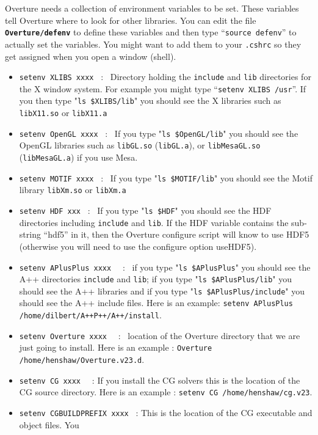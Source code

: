 \documentclass{article}
\begin{document}
Overture needs a collection of environment variables to be set. These variables tell Overture
where to look for other libraries. You can edit the
file {\tt\bf Overture/defenv} to define these variables and then type ``{\tt source defenv}'' to actually set the
variables.
You might want to add them to your {\tt .cshrc} so they get assigned when you open a window (shell).
\begin{itemize}
   \item {\tt setenv XLIBS xxxx} ~:~ Directory holding the {\tt include} and {\tt lib} directories
       for the X window system. For example you might type ``{\tt setenv XLIBS /usr}''.
        If you then type "{\tt ls \$XLIBS/lib}" you should see the X libraries
          such as {\tt libX11.so} or {\tt libX11.a} 
   \item {\tt setenv OpenGL xxxx} ~:~ If you type "{\tt ls \$OpenGL/lib}" you should see the OpenGL libraries
          such as {\tt libGL.so} ({\tt libGL.a}), or {\tt libMesaGL.so} ({\tt libMesaGL.a}) if you use Mesa.
   \item {\tt setenv MOTIF xxxx} ~:~ If you type "{\tt ls \$MOTIF/lib}" you should see the Motif library
          {\tt libXm.so} or {\tt libXm.a} 
   \item {\tt setenv HDF xxx} ~:~ If you type "{\tt ls \$HDF}" you should see the HDF directories including
        {\tt include} and {\tt lib}. If the HDF variable contains the sub-string ``hdf5'' in it, then the
         Overture configure script will know to use HDF5 (otherwise you will need to use the configure option useHDF5).
   \item {\tt setenv APlusPlus xxxx } ~:~ if you type "{\tt ls \$APlusPlus}" you should see the A++
       directories {\tt include} and {\tt lib}; if you type "{\tt ls \$APlusPlus/lib}" you should
       see the A++ libraries and if you type "{\tt ls \$APlusPlus/include}" you should see the A++ include
       files. Here is an example:
       {\tt setenv APlusPlus /home\-/dilbert\-/A++P++\-/A++\-/install}.
   \item {\tt setenv Overture xxxx } ~:~ location of the Overture directory that we are just going
          to install. Here is an example : {\tt Overture /home/henshaw/Overture.v23.d}. 
   \item {\tt setenv CG xxxx } ~: If you install the CG solvers this is the location of the CG source directory.
          Here is an example : {\tt setenv CG /home/henshaw/cg.v23}. 
   \item {\tt setenv CGBUILDPREFIX xxxx} ~: This is the location of the CG executable and object files. You 

\end{itemize}
\end{document}
